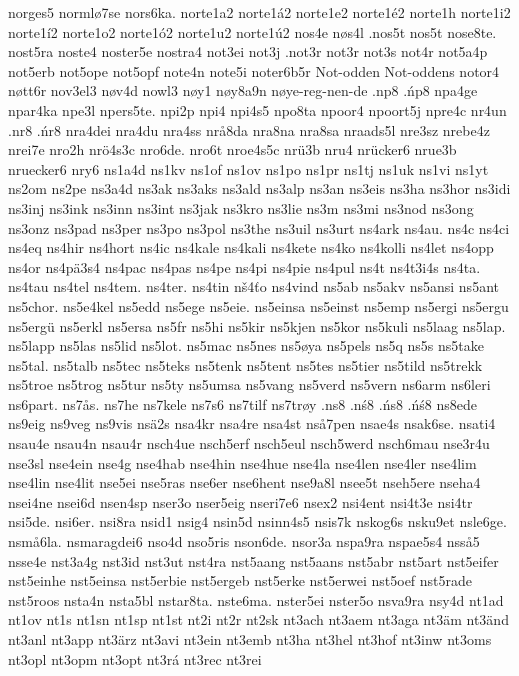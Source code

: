 {{norges5
normlø7se
nors6ka.
norte1a2
norte1á2
norte1e2
norte1é2
norte1h
norte1i2
norte1í2
norte1o2
norte1ó2
norte1u2
norte1ú2
nos4e
nøs4l
.nos5t
nos5t
nose8te.
nost5ra
noste4
noster5e
nostra4
not3ei
not3j
.not3r
not3r
not3s
not4r
not5a4p
not5erb
not5ope
not5opf
note4n
note5i
noter6b5r
Not-odden
Not-oddens
notor4
nøtt6r
nov3el3
nøv4d
nowl3
nøy1
nøy8a9n
nøye-reg-nen-de
.np8
.ńp8
npa4ge
npar4ka
npe3l
npers5te.
npi2p
npi4
npi4s5
npo8ta
npoor4
npoort5j
npre4c
nr4un
.nr8
.ńr8
nra4dei
nra4du
nra4ss
nrå8da
nra8na
nra8sa
nraads5l
nre3sz
nrebe4z
nrei7e
nro2h
nrö4s3c
nro6de.
nro6t
nroe4s5c
nrü3b
nru4
nrücker6
nrue3b
nruecker6
nry6
ns1a4d
ns1kv
ns1of
ns1ov
ns1po
ns1pr
ns1tj
ns1uk
ns1vi
ns1yt
ns2om
ns2pe
ns3a4d
ns3ak
ns3aks
ns3ald
ns3alp
ns3an
ns3eis
ns3ha
ns3hor
ns3idi
ns3inj
ns3ink
ns3inn
ns3int
ns3jak
ns3kro
ns3lie
ns3m
ns3mi
ns3nod
ns3ong
ns3onz
ns3pad
ns3per
ns3po
ns3pol
ns3the
ns3uil
ns3urt
ns4ark
ns4au.
ns4c
ns4ci
ns4eq
ns4hir
ns4hort
ns4ic
ns4kale
ns4kali
ns4kete
ns4ko
ns4kolli
ns4let
ns4opp
ns4or
ns4pä3s4
ns4pac
ns4pas
ns4pe
ns4pi
ns4pie
ns4pul
ns4t
ns4t3i4s
ns4ta.
ns4tau
ns4tel
ns4tem.
ns4ter.
ns4tin
nš4ťo
ns4vind
ns5ab
ns5akv
ns5ansi
ns5ant
ns5chor.
ns5e4kel
ns5edd
ns5ege
ns5eie.
ns5einsa
ns5einst
ns5emp
ns5ergi
ns5ergu
ns5ergü
ns5erkl
ns5ersa
ns5fr
ns5hi
ns5kir
ns5kjen
ns5kor
ns5kuli
ns5laag
ns5lap.
ns5lapp
ns5las
ns5lid
ns5lot.
ns5mac
ns5nes
ns5øya
ns5pels
ns5q
ns5s
ns5take
ns5tal.
ns5talb
ns5tec
ns5teks
ns5tenk
ns5tent
ns5tes
ns5tier
ns5tild
ns5trekk
ns5troe
ns5trog
ns5tur
ns5ty
ns5umsa
ns5vang
ns5verd
ns5vern
ns6arm
ns6leri
ns6part.
ns7ås.
ns7he
ns7kele
ns7s6
ns7tilf
ns7trøy
.ns8
.nś8
.ńs8
.ńś8
ns8ede
ns9eig
ns9veg
ns9vis
nsä2s
nsa4kr
nsa4re
nsa4st
nså7pen
nsae4s
nsak6se.
nsati4
nsau4e
nsau4n
nsau4r
nsch4ue
nsch5erf
nsch5eul
nsch5werd
nsch6mau
nse3r4u
nse3sl
nse4ein
nse4g
nse4hab
nse4hin
nse4hue
nse4la
nse4len
nse4ler
nse4lim
nse4lin
nse4lit
nse5ei
nse5ras
nse6er
nse6hent
nse9a8l
nsee5t
nseh5ere
nseha4
nsei4ne
nsei6d
nsen4sp
nser3o
nser5eig
nseri7e6
nsex2
nsi4ent
nsi4t3e
nsi4tr
nsi5de.
nsi6er.
nsi8ra
nsid1
nsig4
nsin5d
nsinn4s5
nsis7k
nskog6s
nsku9et
nsle6ge.
nsmå6la.
nsmaragdei6
nso4d
nso5ris
nson6de.
nsor3a
nspa9ra
nspae5s4
nsså5
nsse4e
nst3a4g
nst3id
nst3ut
nst4ra
nst5aang
nst5aans
nst5abr
nst5art
nst5eifer
nst5einhe
nst5einsa
nst5erbie
nst5ergeb
nst5erke
nst5erwei
nst5oef
nst5rade
nst5roos
nsta4n
nsta5bl
nstar8ta.
nste6ma.
nster5ei
nster5o
nsva9ra
nsy4d
nt1ad
nt1ov
nt1s
nt1sn
nt1sp
nt1st
nt2i
nt2r
nt2sk
nt3ach
nt3aem
nt3aga
nt3äm
nt3änd
nt3anl
nt3app
nt3ärz
nt3avi
nt3ein
nt3emb
nt3ha
nt3hel
nt3hof
nt3inw
nt3oms
nt3opl
nt3opm
nt3opt
nt3rá
nt3rec
nt3rei
}}

